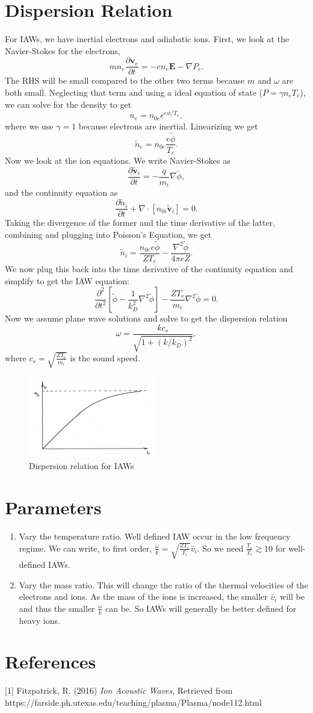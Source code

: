 \documentclass[12pt]{article}
\newcommand{\p}{\partial}
\newcommand{\mb}{\mathbf}
\newenvironment{e}{\begin{enumerate}[label=(\alph*)]}{\end{enumerate}}
\begin{document}
\section*{Dispersion Relation}
For IAWs, we have inertial electrons and adiabatic ions. First, we look at the Navier-Stokes for the electrons,
\[
	mn_e\frac{\p \mb{v}_e}{\p t}=-en_e\mb{E}-\nabla P_e.
\]
The RHS will be small compared to the other two terms because $m$ and $\omega$ are both small. Neglecting that term and using a ideal equation of state ($P=\gamma n_e T_e$), we can solve for the density to get
\[
	n_e=n_{0e} e^{e\phi/T_e},
\]
where we use $\gamma=1$ because electrons are inertial. Linearizing we get
\[
	\tilde{n}_e=n_{0e}\frac{e\tilde{\phi}}{T_e}.
\]
Now we look at the ion equations. We write Navier-Stokes as
\[
\frac{\p \tilde{\mb{v}}_i}{\p t}=-\frac{q}{m_i}\nabla \tilde{\phi},
\]
and the continuity equation as
\[
	\frac{\p \tilde{n}_i}{\p t}+\nabla \cdot [n_{0i}\tilde{\mb{v}}_i]=0.
\]
Taking the divergence of the former and the time derivative of the latter, combining and plugging into Poisson's Equation, we get
\[
	\tilde{n}_i=\frac{n_{0e} e \tilde{\phi}}{Z T_e}-\frac{\nabla ^2 \tilde{\phi}}{4 \pi e Z}.
\]
We now plug this back into the time derivative of the continuity equation and simplify to get the IAW equation:
\[
	\frac{\p ^2}{\p t^2} \left[ \tilde{\phi} - \frac{1}{k_D^2}\nabla ^2 \tilde{\phi}\right]-\frac{Z T_e}{m_i}\nabla ^2 \tilde{\phi} =0.
\]
Now we assume plane wave solutions and solve to get the dispersion relation
\[
	\omega=\frac{k c_s}{\sqrt{1+(k/k_D)^2}},
\]
where $c_s=\sqrt{\frac{Z T_e}{m_i}}$ is the sound speed.

\begin{figure}[H]
	\centering
	\includegraphics[width=0.5\textwidth]{IAW_DR}
	\caption{Dispersion relation for IAWs}
\end{figure}

\section*{Parameters}
\begin{e}
	\item Vary the temperature ratio. Well defined IAW occur in the low frequency regime. We can write, to first order, $\frac{\omega}{k}=\sqrt{\frac{Z T_e}{T_i}}\bar{v}_i$. So we need $\frac{T_e}{T_i}\gtrsim 10$ for well-defined IAWs.
	
	\item Vary the mass ratio. This will change the ratio of the thermal velocities of the electrons and ions. As the mass of the ions is increased, the smaller $\bar{v}_i$ will be and thus the smaller $\frac{\omega}{k}$ can be. So IAWs will generally be better defined for heavy ions.
\end{e}

\section*{References}
[1] Fitzpatrick, R. (2016) \textit{Ion Acoustic Waves}, Retrieved from\\ https://farside.ph.utexas.edu/teaching/plasma/Plasma/node112.html
\end{document}
